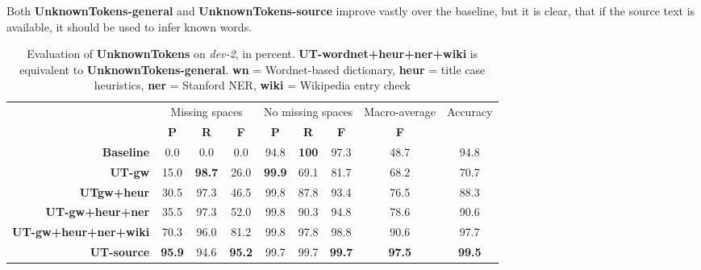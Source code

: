 \documentclass[a4paper,10pt]{scrartcl}
\theoremstyle{style}
\begin{document}
Both \textbf{UnknownTokens-general} and \textbf{UnknownTokens-source} improve vastly over the baseline, but it is clear, that if the source text is available, it should be used to infer known words.

\begin{table}
\begin{center}
\begin{tabular}{r|c|c|c|c|c|c|c|c|}
& \multicolumn{3}{c|}{Missing spaces} & \multicolumn{3}{c|}{No missing spaces} & Macro-average & Accuracy\\
& \textbf{P} & \textbf{R} & \textbf{F} & \textbf{P} & \textbf{R} & \textbf{F} & \textbf{F} & \\
\hline
\textbf{Baseline} & 0.0 & 0.0 & 0.0 & 94.8 & \textbf{100} & 97.3 & 48.7 & 94.8\\
\hline
\textbf{UT-gw} & 15.0 & \textbf{98.7} & 26.0 & \textbf{99.9} & 69.1 & 81.7 & 68.2 & 70.7\\
\hline
\textbf{UTgw+heur} & 30.5 & 97.3 & 46.5 & 99.8 & 87.8 & 93.4 & 76.5 & 88.3\\
\hline
\textbf{UT-gw+heur+ner} & 35.5 & 97.3 & 52.0 & 99.8 & 90.3 & 94.8 & 78.6 & 90.6\\
\hline
\textbf{UT-gw+heur+ner+wiki} & 70.3 & 96.0 & 81.2 & 99.8 & 97.8 & 98.8 & 90.6 & 97.7\\
\hline
\textbf{UT-source} & \textbf{95.9} & 94.6 & \textbf{95.2} & 99.7 & 99.7 & \textbf{99.7} & \textbf{97.5} & \textbf{99.5}\\
\end{tabular}
\end{center}
\caption{Evaluation of \textbf{UnknownTokens} on \textit{dev-2}, in percent. \textbf{UT-wordnet+heur+ner+wiki} is equivalent to \textbf{UnknownTokens-general}. \textbf{wn} = Wordnet-based dictionary, \textbf{heur} = title case heuristics, \textbf{ner} = Stanford NER, \textbf{wiki} = Wikipedia entry check}
\label{eval_unknowntokens}
\end{table}
\end{document}
